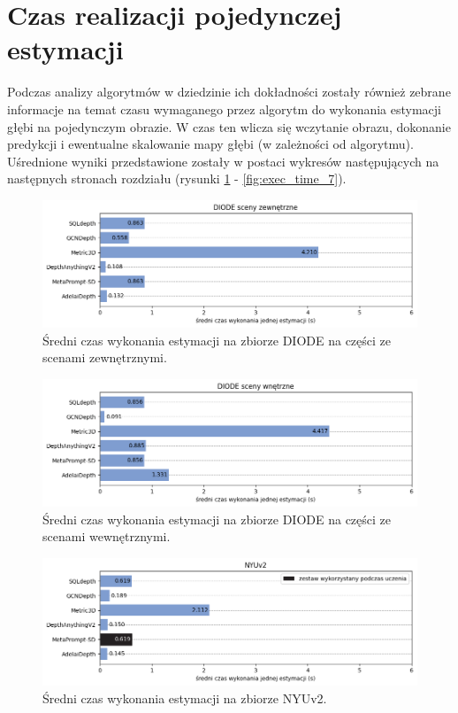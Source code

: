 \section{Czas realizacji pojedynczej estymacji}
Podczas analizy algorytmów w dziedzinie ich dokładności zostały również zebrane informacje na temat czasu wymaganego przez algorytm do wykonania estymacji głębi na pojedynczym obrazie. W czas ten wlicza się wczytanie obrazu, dokonanie predykcji i ewentualne skalowanie mapy głębi (w zależności od algorytmu). Uśrednione wyniki przedstawione zostały w postaci wykresów następujących na następnych stronach rozdziału (rysunki \ref{fig:exec_time_0} - \ref{fig:exec_time_7}).
\begin{figure}[H]
    \centering
    \includegraphics{plots/exec_time/0}
    \caption{Średni czas wykonania estymacji na zbiorze DIODE na części ze scenami zewnętrznymi.}
    \label{fig:exec_time_0}
\end{figure}
\begin{figure}[H]
    \centering
    \includegraphics{plots/exec_time/1}
    \caption{Średni czas wykonania estymacji na zbiorze DIODE na części ze scenami wewnętrznymi.}
    \label{fig:exec_time_1}
\end{figure}
\begin{figure}[H]
    \centering
    \includegraphics{plots/exec_time/2}
    \caption{Średni czas wykonania estymacji na zbiorze NYUv2.}
    \label{fig:exec_time_2}
\end{figure}

